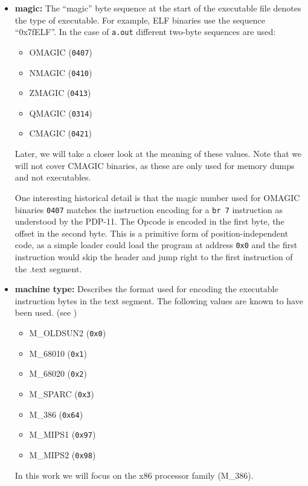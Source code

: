 \documentclass[draft,final]{vutinfth} %
\begin{document}
\vspace{0.25cm}

\begin{itemize}
\item \textbf{magic:} The ``magic'' byte sequence at the start of the executable file denotes the type of executable. For example, ELF binaries use the sequence ``0x7fELF''\cite{ElfManPage}. In the case of \texttt{a.out} different two-byte sequences are used\cite[lines 63-74]{AoutHDef}:
  \begin{itemize}
    \item OMAGIC (\texttt{0407}) %
    \item NMAGIC (\texttt{0410})
    \item ZMAGIC (\texttt{0413})
    \item QMAGIC (\texttt{0314})
    \item CMAGIC (\texttt{0421})
  \end{itemize}
Later, we will take a closer look at the meaning of these values. Note that we will not cover CMAGIC binaries, as these are only used for memory dumps and not executables.

One interesting historical detail is that the magic number used for OMAGIC binaries \texttt{0407} matches the instruction encoding for a \texttt{br 7} instruction as understood by the PDP-11\cite[page 4-37]{PDP1140Handbook}. The Opcode is encoded in the first byte, the offset in the second byte. This is a primitive form of position-independent code, as a simple loader could load the program at address \texttt{0x0} and the first instruction would skip the header and jump right to the first instruction of the .text segment\cite[page 51, footnote 1]{Levine}.

\item \textbf{machine type:} Describes the format used for encoding the executable instruction bytes in the text segment. The following values are known to have been used. (see \cite{AoutHDef})
  \begin{itemize}
   \item M\_OLDSUN2 (\texttt{0x0})
   \item M\_68010 (\texttt{0x1})
   \item M\_68020 (\texttt{0x2})
   \item M\_SPARC (\texttt{0x3})
   \item M\_386 (\texttt{0x64})
   \item M\_MIPS1 (\texttt{0x97})
   \item M\_MIPS2 (\texttt{0x98})
  \end{itemize}
In this work we will focus on the x86 processor family (M\_386).


\end{itemize}
\end{document}
